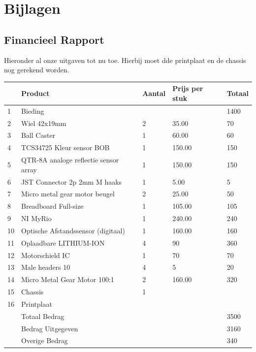 \documentclass[kulak]{kulakarticle} %
\begin{document}
\section{Bijlagen}
\subsection{Financieel Rapport}
Hieronder al onze uitgaven tot nu toe. Hierbij moet dde printplaat en de chassis nog gerekend worden. 
\begin{tabular}{  l | l | l | l | l }
	
	& Product & Aantal & Prijs per stuk & Totaal  \\ \hline
	1 & Bieding & & & 1400 \\ \hline
	2 & Wiel 42x19mm & 2 & 35.00 & 70 \\ \hline
	3 & Ball Caster & 1 & 60.00 & 60   \\ \hline
	4 & TCS34725 Kleur sensor BOB  & 1 & 150.00 & 150   \\ \hline
	5 & QTR-8A analoge reflectie sensor array & 1 & 150.00 & 150 \\ \hline
	6 & JST Connector 2p 2mm M haaks & 1 & 5.00 & 5 \\ \hline	
	7 & Micro metal gear motor beugel & 2 & 25.00 & 50 \\ \hline
	8 & Breadboard Full-size & 1 & 105.00 & 105   \\ \hline
	9 & NI MyRio & 1 & 240.00 & 240 \\ \hline
	10 & Optische Afstandssensor (digitaal) & 1 & 160.00 & 160  \\ \hline
	11 & Oplaadbare LITHIUM-ION & 4 & 90 & 360 \\ \hline
	12 & Motorschield IC & 1 & 70 & 70  \\ \hline
	13 & Male headers 10 & 4 & 5 & 20   \\ \hline
	14 & Micro Metal Gear Motor 100:1 & 2 & 160.00 & 320 \\ \hline
	15 & Chassis & 1 & & \\ \hline
	16 & Printplaat & & &  \\ \hline
	& Totaal Bedrag & & & 3500\\ 
	& Bedrag Uitgegeven & & & 3160 \\ 
	& Overige Bedrag & & & 340
	
\end{tabular}
\end{document}
